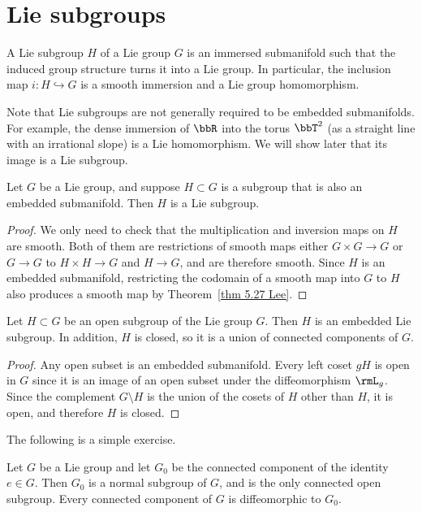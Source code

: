 \section{Lie subgroups}

\begin{defn}
    A Lie subgroup $H$ of a Lie group $G$ is an immersed submanifold such that the induced group structure turns it into a Lie group. In particular, the inclusion map $i:H\hookrightarrow G$ is a smooth immersion and a Lie group homomorphism.
\end{defn}

Note that Lie subgroups are not generally required to be embedded submanifolds. For example, the dense immersion of $\bbR$ into the torus $\bbT^2$ (as a straight line with an irrational slope) is a Lie homomorphism. We will show later that its image is a Lie subgroup.

\begin{prop}\label{prop 7.11 Lee}
    Let $G$ be a Lie group, and suppose $H\subset G$ is a subgroup that is also an embedded submanifold. Then $H$ is a Lie subgroup.
\end{prop}
\begin{proof}
    We only need to check that the multiplication and inversion maps on $H$ are smooth. Both of them are restrictions of smooth maps either $G\times G\to G$ or $G\to G$ to $H\times H\to G$ and $H\to G$, and are therefore smooth. Since $H$ is an embedded submanifold, restricting the codomain of a smooth map into $G$ to $H$ also produces a smooth map by Theorem~\ref{thm 5.27 Lee}.
\end{proof}

\begin{lem}\label{lem 7.12 Lee}
    Let $H\subset G$ be an open subgroup of the Lie group $G$. Then $H$ is an embedded Lie subgroup. In addition, $H$ is closed, so it is a union of connected components of $G$.
\end{lem}
\begin{proof}
    Any open subset is an embedded submanifold. Every left coset $gH$ is open in $G$ since it is an image of an open subset under the diffeomorphism $\rmL_g$. Since the complement $G\setminus H$ is the union of the cosets of $H$ other than $H$, it is open, and therefore $H$ is closed.
\end{proof}

The following is a simple exercise.
\begin{prop}
    Let $G$ be a Lie group and let $G_0$ be the connected component of the identity $e\in G$. Then $G_0$ is a normal subgroup of $G$, and is the only connected open subgroup. Every connected component of $G$ is diffeomorphic to $G_0$.
\end{prop}

